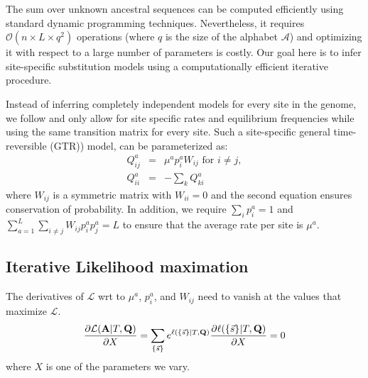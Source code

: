 \documentclass[aps,rmp, onecolumn]{revtex4}
\newcommand{\mat}[1]{{\bf #1}}
\newcommand{\abet}{\mathcal{A}}
\newcommand{\eqp}{p}
\newcommand{\LH}{\mathcal{L}}
\newcommand{\lh}{\ell}
\begin{document}
The sum over unknown ancestral sequences can be computed efficiently using standard dynamic programming techniques.
Nevertheless, it requires $\mathcal{O}(n\times L \times q^2)$ operations (where $q$ is the size of the alphabet $\abet$) and optimizing it with respect to a large number of parameters is costly.
Our goal here is to infer site-specific substitution models using a computationally efficient iterative procedure.

Instead of inferring completely independent models for every site in the genome, we follow \citet{halpern_evolutionary_1998} and only allow for site specific rates and equilibrium frequencies while using the same transition matrix for every site.
Such a site-specific general time-reversible (GTR)) model, can be parameterized as:
\begin{eqnarray}
Q^{a}_{ij} &=& \mu^{a}\eqp^{a}_{i} W_{ij} \textrm{ for } i\neq j,\nonumber \\
Q^{a}_{ii} &=& -\sum_k Q^{a}_{ki}
\label{eq:Qij}
\end{eqnarray}
where $W_{ij}$ is a symmetric matrix with $W_{ii}=0$ and the second equation ensures conservation of probability.
In addition, we require $\sum_i \eqp^{a}_i = 1$ and $\sum_{a=1}^L\sum_{i\neq j}W_{ij}p^{a}_ip^{a}_j=L$ to ensure that the average rate per site is $\mu^{a}$.


\subsection*{Iterative Likelihood maximation}
The derivatives of $\LH$ wrt to $\mu^a$, $\eqp_i^a$, and $W_{ij}$ need to vanish at the values that maximize $\LH$.
\begin{equation}
	\frac{\partial \LH(\mat{A}|T,\mat{Q})}{\partial X} = \sum_{\{\vec{s}\}} e^{\lh(\{\vec{s}\} |T, \mat{Q})} \frac{\partial \ell(\{\vec{s}\}|T,\mat{Q})}{\partial X} = 0
\end{equation}
where $X$ is one of the parameters we vary.
\end{document}
